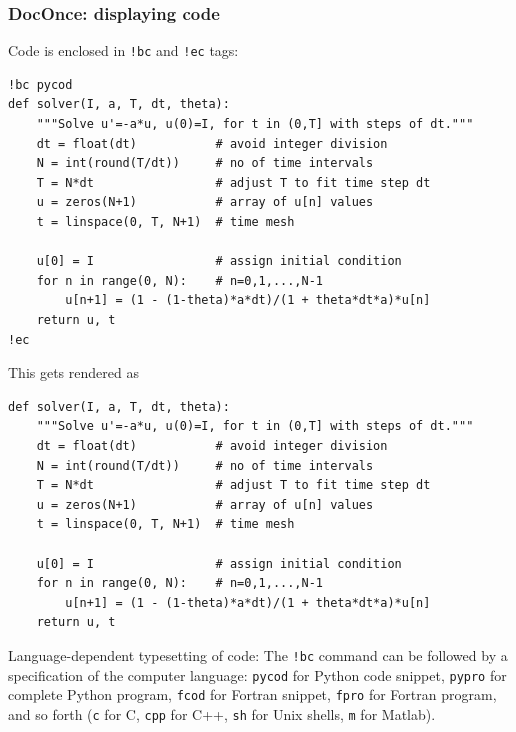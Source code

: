 \documentclass{beamer}
\begin{document}
\begin{frame}
\frametitle{DocOnce: displaying code}

Code is enclosed in \Verb?!bc? and \Verb?!ec? tags:
















\begin{verbatim}
!bc pycod
def solver(I, a, T, dt, theta):
    """Solve u'=-a*u, u(0)=I, for t in (0,T] with steps of dt."""
    dt = float(dt)           # avoid integer division
    N = int(round(T/dt))     # no of time intervals
    T = N*dt                 # adjust T to fit time step dt
    u = zeros(N+1)           # array of u[n] values
    t = linspace(0, T, N+1)  # time mesh

    u[0] = I                 # assign initial condition
    for n in range(0, N):    # n=0,1,...,N-1
        u[n+1] = (1 - (1-theta)*a*dt)/(1 + theta*dt*a)*u[n]
    return u, t
!ec

\end{verbatim}

This gets rendered as














\begin{verbatim}
def solver(I, a, T, dt, theta):
    """Solve u'=-a*u, u(0)=I, for t in (0,T] with steps of dt."""
    dt = float(dt)           # avoid integer division
    N = int(round(T/dt))     # no of time intervals
    T = N*dt                 # adjust T to fit time step dt
    u = zeros(N+1)           # array of u[n] values
    t = linspace(0, T, N+1)  # time mesh

    u[0] = I                 # assign initial condition
    for n in range(0, N):    # n=0,1,...,N-1
        u[n+1] = (1 - (1-theta)*a*dt)/(1 + theta*dt*a)*u[n]
    return u, t

\end{verbatim}


\begin{block}{Language-dependent typesetting of code: }
The \Verb?!bc? command can be followed by a specification of the computer
language: \texttt{pycod} for Python code snippet, \texttt{pypro} for complete Python
program, \texttt{fcod} for Fortran snippet, \texttt{fpro} for Fortran program, and so
forth (\texttt{c} for C, \texttt{cpp} for C++, \texttt{sh} for Unix shells, \texttt{m} for Matlab).
\end{block}
\end{frame}
\end{document}
